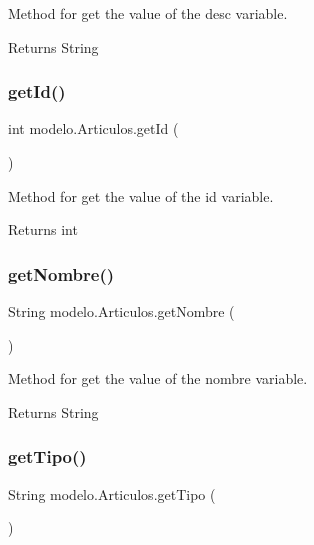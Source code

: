 Method for get the value of the desc variable. 

\begin{DoxyReturn}{Returns}
String 
\end{DoxyReturn}
\mbox{\label{classmodelo_1_1_articulos_a4784500f94b55f2cf7ed8670bf15a6ca}} 
\subsubsection{\texorpdfstring{get\+Id()}{getId()}}
{\footnotesize\ttfamily int modelo.\+Articulos.\+get\+Id (\begin{DoxyParamCaption}{ }\end{DoxyParamCaption})}



Method for get the value of the id variable. 

\begin{DoxyReturn}{Returns}
int 
\end{DoxyReturn}
\mbox{\label{classmodelo_1_1_articulos_a7782939b3b47698ff92e5349c6558b17}} 
\subsubsection{\texorpdfstring{get\+Nombre()}{getNombre()}}
{\footnotesize\ttfamily String modelo.\+Articulos.\+get\+Nombre (\begin{DoxyParamCaption}{ }\end{DoxyParamCaption})}



Method for get the value of the nombre variable. 

\begin{DoxyReturn}{Returns}
String 
\end{DoxyReturn}
\mbox{\label{classmodelo_1_1_articulos_a894f705611372b68e0bb520350626983}} 
\subsubsection{\texorpdfstring{get\+Tipo()}{getTipo()}}
{\footnotesize\ttfamily String modelo.\+Articulos.\+get\+Tipo (\begin{DoxyParamCaption}{ }\end{DoxyParamCaption})}



